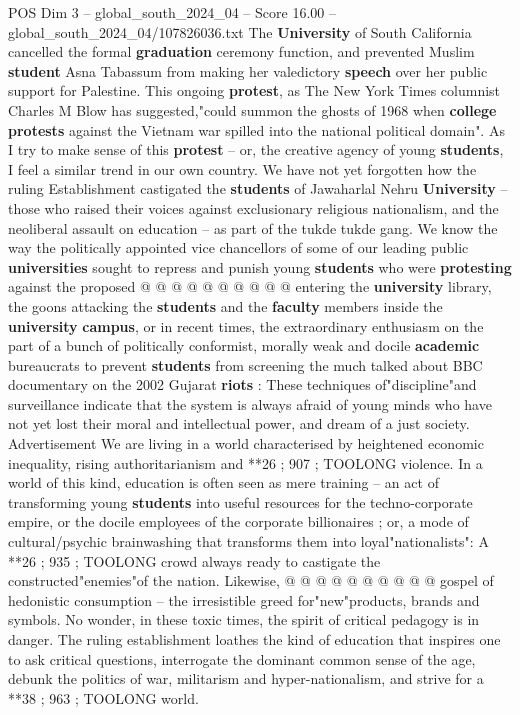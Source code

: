 \begin{textsample}{POS Dim 3 – global\_south\_2024\_04 – Score 16.00 – global\_south\_2024\_04/107826036.txt}
The \textbf{University} of South California cancelled the formal \textbf{graduation} ceremony function, and prevented Muslim \textbf{student} Asna Tabassum from making her valedictory \textbf{speech} over her public support for Palestine.
This ongoing \textbf{protest}, as The New York Times columnist Charles M Blow has suggested,"could summon the ghosts of 1968 when \textbf{college} \textbf{protests} against the Vietnam war spilled into the national political domain".
As I try to make sense of this \textbf{protest} -- or, the creative agency of young \textbf{students}, I feel a similar trend in our own country.
We have not yet forgotten how the ruling Establishment castigated the \textbf{students} of Jawaharlal Nehru \textbf{University} -- those who raised their voices against exclusionary religious nationalism, and the neoliberal assault on education -- as part of the tukde tukde gang.
We know the way the politically appointed vice chancellors of some of our leading public \textbf{universities} sought to repress and punish young \textbf{students} who were \textbf{protesting} against the proposed @ @ @ @ @ @ @ @ @ @ entering the \textbf{university} library, the goons attacking the \textbf{students} and the \textbf{faculty} members inside the \textbf{university} \textbf{campus}, or in recent times, the extraordinary enthusiasm on the part of a bunch of politically conformist, morally weak and docile \textbf{academic} bureaucrats to prevent \textbf{students} from screening the much talked about BBC documentary on the 2002 Gujarat \textbf{riots} : These techniques of"discipline"and surveillance indicate that the system is always afraid of young minds who have not yet lost their moral and intellectual power, and dream of a just society.
Advertisement We are living in a world characterised by heightened economic inequality, rising authoritarianism and **26 ; 907 ; TOOLONG violence.
In a world of this kind, education is often seen as mere training -- an act of transforming young \textbf{students} into useful resources for the techno-corporate empire, or the docile employees of the corporate billionaires ; or, a mode of cultural/psychic brainwashing that transforms them into loyal"nationalists": A **26 ; 935 ; TOOLONG crowd always ready to castigate the constructed"enemies"of the nation.
Likewise, @ @ @ @ @ @ @ @ @ @ gospel of hedonistic consumption -- the irresistible greed for"new"products, brands and symbols.
No wonder, in these toxic times, the spirit of critical pedagogy is in danger.
The ruling establishment loathes the kind of education that inspires one to ask critical questions, interrogate the dominant common sense of the age, debunk the politics of war, militarism and hyper-nationalism, and strive for a **38 ; 963 ; TOOLONG world.

\end{textsample}
